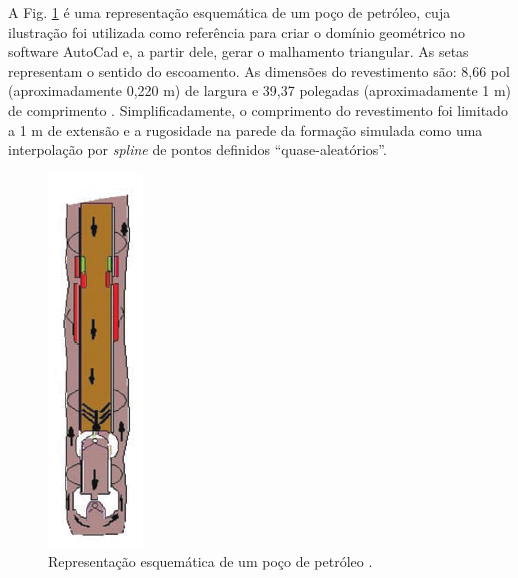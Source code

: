 A Fig. \ref{fig:desenho_referencia_broca} é uma representação esquemática de um poço de petróleo, cuja ilustração foi utilizada como referência para criar o domínio geométrico no software AutoCad e, a partir dele, gerar o malhamento triangular. As setas representam o sentido do escoamento. As dimensões do revestimento são: 8,66 pol (aproximadamente 0,220 m) de largura e 39,37 polegadas (aproximadamente 1 m) de comprimento \cite{Rocha}. Simplificadamente, o comprimento do revestimento foi limitado a 1 m de extensão e a rugosidade na parede da formação simulada como uma interpolação por \textit{spline} de pontos definidos ``quase-aleatórios''.
\begin{figure}[H]
	\centering
	\includegraphics[scale=0.7]{img/casing1.png}
	\caption[Representação esquemática de um poço de petróleo.]{Representação esquemática de um poço de petróleo \cite{Erik}.}
	\label{fig:desenho_referencia_broca}
\end{figure}

